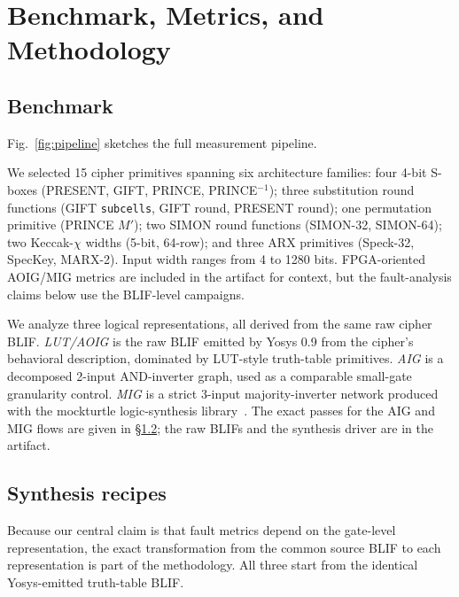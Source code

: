 \section{Benchmark, Metrics, and Methodology}
\label{sec:methodology}

\subsection{Benchmark}
\label{sec:methodology:benchmark}


Fig.~\ref{fig:pipeline} sketches the full measurement pipeline.

We selected 15 cipher primitives spanning six architecture families:
four 4-bit S-boxes (PRESENT, GIFT, PRINCE, PRINCE$^{-1}$); three
substitution round functions (GIFT \texttt{subcells}, GIFT round,
PRESENT round); one permutation primitive (PRINCE $M'$); two SIMON
round functions (SIMON-32, SIMON-64); two Keccak-$\chi$ widths
(5-bit, 64-row); and three ARX primitives (Speck-32, SpecKey,
MARX-2). Input width ranges from 4 to 1280 bits. FPGA-oriented
AOIG/MIG metrics are included in the artifact for context, but
the fault-analysis claims below use the BLIF-level campaigns.

We analyze three logical representations, all derived from the same raw
cipher BLIF. \emph{LUT/AOIG} is the raw BLIF emitted by Yosys 0.9 from
the cipher's behavioral description, dominated by LUT-style truth-table
primitives. \emph{AIG} is a decomposed 2-input AND-inverter graph, used as a
comparable small-gate granularity control.
\emph{MIG} is a strict 3-input majority-inverter network produced with
the mockturtle logic-synthesis library~\cite{soeken2018mockturtle}. The
exact passes for the AIG and MIG flows are given in
\S\ref{sec:methodology:recipes}; the raw BLIFs and the synthesis driver
are in the artifact.

\subsection{Synthesis recipes}
\label{sec:methodology:recipes}

Because our central claim is that fault metrics depend on the gate-level
representation, the exact transformation from the common source BLIF to
each representation is part of the methodology. All three start from the
identical Yosys-emitted truth-table BLIF.

